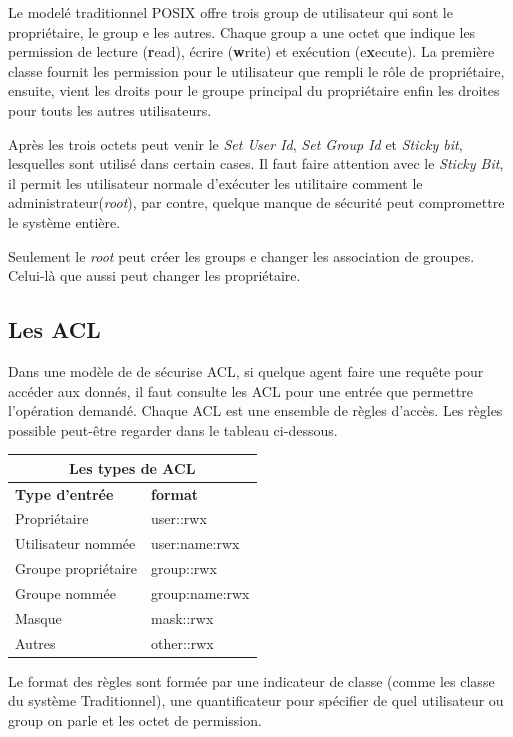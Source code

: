 Le modelé traditionnel POSIX offre trois group de utilisateur qui sont le propriétaire, le group e les autres. Chaque group a une octet que indique les permission de lecture (\textbf{r}ead), écrire (\textbf{w}rite) et exécution (e\textbf{x}ecute). La première classe fournit les permission pour le utilisateur que rempli le rôle de propriétaire, ensuite, vient les droits pour le groupe principal du propriétaire enfin les droites pour touts les autres utilisateurs. 
 
Après les trois octets peut venir le \emph{Set User Id}, \emph{Set Group Id} et \emph{Sticky bit}, lesquelles sont utilisé dans certain cases. Il faut faire attention avec le \emph{Sticky Bit}, il permit les utilisateur normale d'exécuter les utilitaire comment le administrateur(\emph{root}), par contre, quelque manque de sécurité peut compromettre le système entière.

Seulement le \emph{root} peut créer les groups e changer les association de groupes. Celui-là que aussi peut changer les propriétaire. 

\subsection*{Les ACL}

Dans une modèle de de sécurise ACL, si quelque agent faire une requête pour accéder aux donnés, il faut consulte les ACL pour une entrée que permettre l'opération demandé. Chaque ACL est une ensemble de règles d'accès. Les règles possible peut-être regarder dans le tableau ci-dessous. 
\begin{center}
\begin{tabular}{|l|l|}
  \hline
    \multicolumn{2}{|c|}{Les types de ACL} \\
  \hline
	\textbf{Type d'entrée} & \textbf{format} \\
  \hline
	Propriétaire & user::rwx \\
	Utilisateur nommée & user:name:rwx  \\
	Groupe propriétaire & group::rwx \\
	Groupe nommée & group:name:rwx \\
	Masque & mask::rwx \\
	Autres & other::rwx \\   
  \hline
\end{tabular}
\end{center}

Le format des règles sont formée par une indicateur de classe (comme les classe du système Traditionnel), une quantificateur pour spécifier de quel utilisateur ou group on parle et les octet de permission.


